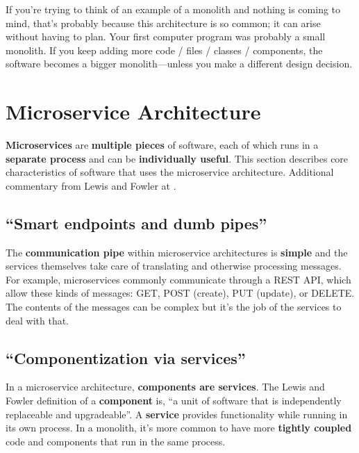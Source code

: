 If you're trying to think of an example of a monolith and nothing is coming to mind, that's probably because this architecture is so common; it can arise without having to plan. Your first computer program was probably a small monolith. If you keep adding more code / files / classes / components, the software becomes a bigger monolith---unless you make a different design decision.

\section{Microservice Architecture}

\textbf{Microservices} are \textbf{multiple pieces} of software, each of which runs in a \textbf{separate process} and can be \textbf{individually useful}. This section describes core characteristics of software that uses the microservice architecture. Additional commentary from Lewis and Fowler at \parencite{fowler2019microservices}. 

\subsection{``Smart endpoints and dumb pipes''}
The \textbf{communication pipe} within microservice architectures is \textbf{simple} and the services themselves take care of translating and otherwise processing messages. For example, microservices commonly communicate through a REST API, which allow these kinds of messages: GET, POST (create), PUT (update), or DELETE. The contents of the messages can be complex but it's the job of the services to deal with that.

\subsection{``Componentization via services''}\marginpar{\componentDef\margindivider}\marginpar{\serviceDef\margindivider}\marginpar{\couplingDef\margindivider}\marginpar{\encapsulationDef}

In a microservice architecture, \textbf{components are services}. The Lewis and Fowler definition of a \textbf{component} is, ``a unit of software that is independently replaceable and upgradeable''. A \textbf{service} provides functionality while running in its own process. In a monolith, it's more common to have more \textbf{tightly coupled} code and components that run in the same process.

